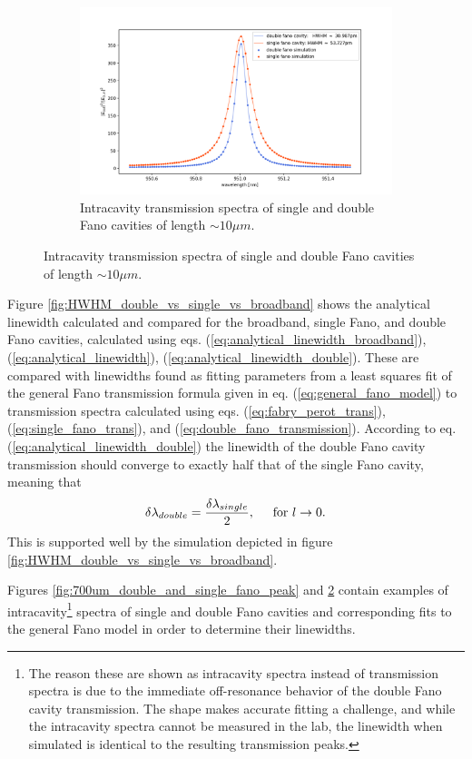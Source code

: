 \begin{figure}[h!]
\begin{subfigure}[c]{0.34\textwidth}
        \label{fig:700um_double_and_single_fano_peak}
        \includegraphics[width=\textwidth]{figures/sim_single_vs_double_10um.png}
        \caption{Intracavity transmission spectra of single and double Fano cavities of length $\sim 10 \mu m$.}
        \label{fig:10um_double_and_single_fano_peak}
    \end{subfigure}
\end{figure}

Figure \ref{fig:HWHM_double_vs_single_vs_broadband} shows the analytical linewidth calculated and compared for the broadband, single Fano, and double Fano cavities, calculated using eqs. (\ref{eq:analytical_linewidth_broadband}), (\ref{eq:analytical_linewidth}), (\ref{eq:analytical_linewidth_double}). These are compared with linewidths found as fitting parameters from a least squares fit of the general Fano transmission formula given in eq. (\ref{eq:general_fano_model}) to transmission spectra calculated using eqs. (\ref{eq:fabry_perot_trans}), (\ref{eq:single_fano_trans}), and (\ref{eq:double_fano_transmission}). According to eq. (\ref{eq:analytical_linewidth_double}) the linewidth of the double Fano cavity transmission should converge to exactly half that of the single Fano cavity, meaning that
\begin{equation}
    \delta \lambda_{double} = \frac{\delta \lambda_{single}}{2}, \hspace{0.5cm} \text{for } l \rightarrow 0.
\end{equation}
This is supported well by the simulation depicted in figure \ref{fig:HWHM_double_vs_single_vs_broadband}.

Figures \ref{fig:700um_double_and_single_fano_peak} and \ref{fig:10um_double_and_single_fano_peak} contain examples of intracavity\footnote{The reason these are shown as intracavity spectra instead of transmission spectra is due to the immediate off-resonance behavior of the double Fano cavity transmission. The shape makes accurate fitting a challenge, and while the intracavity spectra cannot be measured in the lab, the linewidth when simulated is identical to the resulting transmission peaks.} spectra of single and double Fano cavities and corresponding fits to the general Fano model in order to determine their linewidths. 

